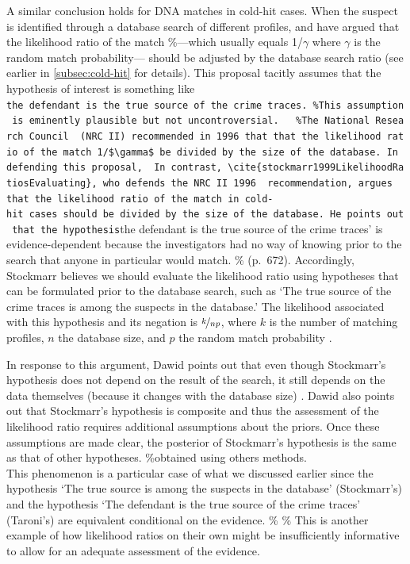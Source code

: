 \documentclass[10pt,dvipsnames,enabledeprecatedfontcommands]{scrartcl}
\begin{document}
A similar conclusion holds for DNA matches in cold-hit cases. When the
suspect is identified through a database search of different profiles,
\cite{taroni2006bayesian} and \cite{balding1996EvaluatingDNAProfilea}
have argued that the likelihood ratio of the match \%---which usually
equals 1/\(\gamma\) where \(\gamma\) is the random match probability---
should be adjusted by the database search ratio (see earlier in
\ref{subsec:cold-hit} for details). This proposal tacitly assumes that
the hypothesis of interest is something like
\texttt{the\ defendant\ is\ the\ true\ source\ of\ the\ crime\ traces.\textquotesingle{}\ \%This\ assumption\ is\ eminently\ plausible\ but\ not\ uncontroversial.\ \ \ \%The\ National\ Research\ Council\ \ (NRC\ II)\ recommended\ in\ 1996\ that\ that\ the\ likelihood\ ratio\ of\ the\ match\ 1/\$\textbackslash{}gamma\$\ be\ divided\ by\ the\ size\ of\ the\ database.\ In\ defending\ this\ proposal,\ \ In\ contrast,\ \textbackslash{}cite\{stockmarr1999LikelihoodRatiosEvaluating\},\ who\ defends\ the\ NRC\ II\ 1996\ \ recommendation,\ argues\ \ that\ the\ likelihood\ ratio\ of\ the\ match\ in\ cold-hit\ cases\ should\ be\ divided\ by\ the\ size\ of\ the\ database.\ He\ points\ out\ that\ the\ hypothesis}the
defendant is the true source of the crime traces' is evidence-dependent
because the investigators had no way of knowing prior to the search that
anyone in particular would match. \% (p.~672). Accordingly, Stockmarr
believes we should evaluate the likelihood ratio using hypotheses that
can be formulated prior to the database search, such as `The true source
of the crime traces is among the suspects in the database.' The
likelihood associated with this hypothesis and its negation is
\(\nicefrac{k}{np}\), where \(k\) is the number of matching profiles,
\(n\) the database size, and \(p\) the random match probability
\citep[see][for a derivation]{stockmarr1999LikelihoodRatiosEvaluating}.

In response to this argument, Dawid points out that even though
Stockmarr's hypothesis does not depend on the result of the search, it
still depends on the data themselves (because it changes with the
database size) \citep{dawid2001CommentStockmarrLikelihood}. Dawid also
points out that Stockmarr's hypothesis is composite and thus the
assessment of the likelihood ratio requires additional assumptions about
the priors. Once these assumptions are made clear, the posterior of
Stockmarr's hypothesis is the same as that of other hypotheses.
\%obtained using others methods.\\
This phenomenon is a particular case of what we discussed earlier since
the hypothesis `The true source is among the suspects in the database'
(Stockmarr's) and the hypothesis `The defendant is the true source of
the crime traces' (Taroni's) are equivalent conditional on the evidence.
\%
\%
This is another example of how likelihood ratios on their own might be
insufficiently informative to allow for an adequate assessment of the
evidence.
\end{document}
